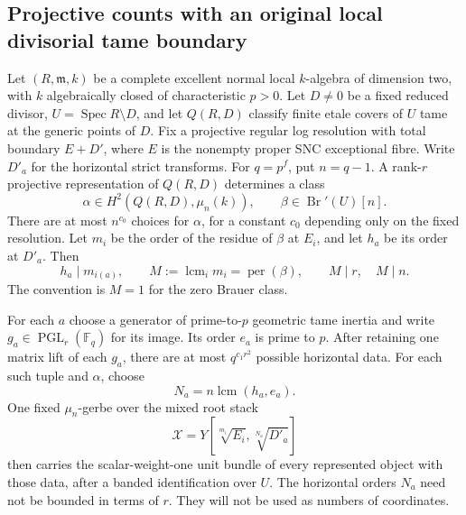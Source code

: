 \subsection{Projective counts with an original local divisorial tame boundary}

\begin{lemma}
\label{D:local-pair-coefficient-root-comparison}
Let $(R,\mathfrak m,k)$ be a complete excellent normal local
$k$-algebra of dimension two, with $k$ algebraically closed of
characteristic $p>0$. Let $D\ne0$ be a fixed reduced divisor,
$U=\operatorname{Spec}R\setminus D$, and let $Q(R,D)$ classify
finite etale covers of $U$ tame at the generic points of $D$.
Fix a projective regular log resolution with total boundary
$E+D'$, where $E$ is the nonempty proper SNC exceptional fibre.
Write $D'_a$ for the horizontal strict transforms.
For $q=p^f$, put $n=q-1$. A rank-$r$ projective representation
of $Q(R,D)$ determines a class
\[
        \alpha\in H^2(Q(R,D),\mu_n(k)),
        \qquad \beta\in\operatorname{Br}'(U)[n].
 \tag{D.LPT.1}
\]
There are at most $n^{c_0}$ choices for $\alpha$, for a constant
$c_0$ depending only on the fixed resolution. Let $m_i$ be the
order of the residue of $\beta$ at $E_i$, and let $h_a$ be its
order at $D'_a$. Then
\[
 h_a\mid m_{i(a)},\qquad
 M:=\operatorname{lcm}_i m_i=\operatorname{per}(\beta),
                     \qquad M\mid r,\quad M\mid n.
 \tag{D.LPT.2}
\]
The convention is $M=1$ for the zero Brauer class.

For each $a$ choose a generator of prime-to-$p$ geometric tame
inertia and write $g_a\in\operatorname{PGL}_r(\mathbb F_q)$ for
its image. Its order $e_a$ is prime to $p$.
After retaining one matrix lift of each $g_a$, there are at most
$q^{c_1r^2}$ possible horizontal data. For each such tuple and
$\alpha$, choose
\[
             N_a=n\operatorname{lcm}(h_a,e_a).
 \tag{D.LPT.3}
\]
One fixed $\mu_n$-gerbe over the mixed root stack
\[
 \mathcal X=Y[\sqrt[m_i]{E_i},\sqrt[N_a]{D'_a}]
 \tag{D.LPT.4}
\]
then carries the scalar-weight-one unit bundle of every represented
object with those data, after a banded identification over $U$.
The horizontal orders $N_a$ need not be bounded in terms of $r$.
They will not be used as numbers of coordinates.
\end{lemma}

